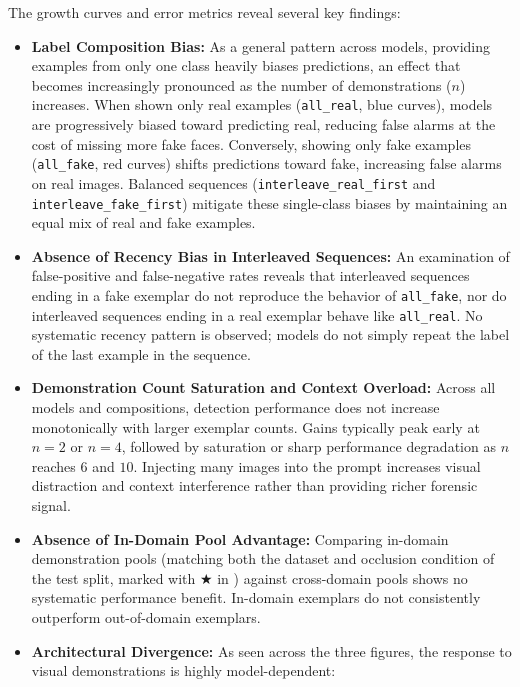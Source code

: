 The growth curves and error metrics reveal several key findings:
\begin{itemize}
    \item \textbf{Label Composition Bias:} As a general pattern across models, providing examples from only one class heavily biases predictions, an effect that becomes increasingly pronounced as the number of demonstrations ($n$) increases. When shown only real examples (\texttt{all\_real}, blue curves), models are progressively biased toward predicting real, reducing false alarms at the cost of missing more fake faces. Conversely, showing only fake examples (\texttt{all\_fake}, red curves) shifts predictions toward fake, increasing false alarms on real images. Balanced sequences (\texttt{interleave\_real\_first} and \texttt{interleave\_fake\_first}) mitigate these single-class biases by maintaining an equal mix of real and fake examples.
    \item \textbf{Absence of Recency Bias in Interleaved Sequences:} An examination of false-positive and false-negative rates reveals that interleaved sequences ending in a fake exemplar do not reproduce the behavior of \texttt{all\_fake}, nor do interleaved sequences ending in a real exemplar behave like \texttt{all\_real}. No systematic recency pattern is observed; models do not simply repeat the label of the last example in the sequence.
    \item \textbf{Demonstration Count Saturation and Context Overload:} Across all models and compositions, detection performance does not increase monotonically with larger exemplar counts. Gains typically peak early at $n = 2$ or $n = 4$, followed by saturation or sharp performance degradation as $n$ reaches $6$ and $10$. Injecting many images into the prompt increases visual distraction and context interference rather than providing richer forensic signal.
    \item \textbf{Absence of In-Domain Pool Advantage:} Comparing in-domain demonstration pools (matching both the dataset and occlusion condition of the test split, marked with $\bigstar$ in ) against cross-domain pools shows no systematic performance benefit. In-domain exemplars do not consistently outperform out-of-domain exemplars.
    \item \textbf{Architectural Divergence:} As seen across the three figures, the response to visual demonstrations is highly model-dependent:
    \begin{itemize}

\end{itemize}
\end{itemize}

